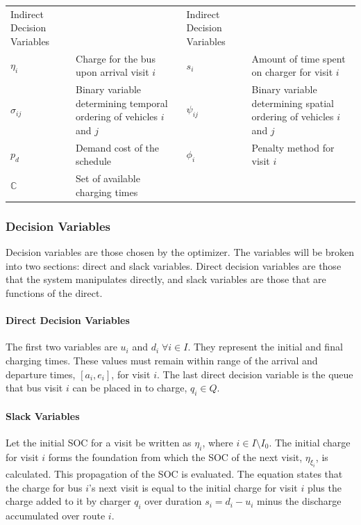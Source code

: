 \documentclass[11pt,a4paper,final]{article}
\newcommand{\C}{\mathbb{C}}                 %
\newcommand{\Iset}{I}                       %
\newcommand{\Qset}{Q}                       %
\begin{document}
\begin{table}[htbp]
\begin{tabularx}{\textwidth}{L{0.3} L{1.2} L{0.3} L{1.2}}
Indirect Decision Variables &  & Indirect Decision Variables & \\[0pt]
\(\eta_i\) & Charge for the bus upon arrival visit \(i\) & \(s_i\) & Amount of time spent on charger for visit \(i\)\\[0pt]
\(\sigma_{ij}\) & Binary variable determining temporal ordering of vehicles \(i\) and \(j\) & \(\psi_{ij}\) & Binary variable determining spatial ordering of vehicles \(i\) and \(j\)\\[0pt]
\(p_{d}\) & Demand cost of the schedule & \(\phi_i\) & Penalty method for visit \(i\)\\[0pt]
\(\C\) & Set of available charging times &  & \\[0pt]
\hline
\end{tabularx}
\end{table}

\subsubsection{Decision Variables}
\label{sec:decision-variables}
Decision variables are those chosen by the optimizer. The variables will be broken into two sections: direct and slack
variables. Direct decision variables are those that the system manipulates directly, and slack variables are those that
are functions of the direct.

\paragraph{Direct Decision Variables}
\label{sec:direct-decision-variables}
The first two variables are \(u_i\) and \(d_i \; \forall i \in \Iset\). They represent the initial and final charging times. These
values must remain within range of the arrival and departure times, \([a_i, e_i]\), for visit \(i\). The last direct
decision variable is the queue that bus visit \(i\) can be placed in to charge, \(q_i \in \Qset\).

\paragraph{Slack Variables}
\label{sec:slack-decision-variables}
Let the initial SOC for a visit be written as \(\eta_i\), where \(i \in \Iset \setminus \Iset_0\). The initial charge for visit \(i\) forms
the foundation from which the SOC of the next visit, \(\eta_{\xi_i}\), is calculated. This propagation of the SOC is evaluated.
The equation states that the charge for bus \(i\)'s next visit is equal to the initial charge for visit \(i\) plus the
charge added to it by charger \(q_i\) over duration \(s_i = d_i - u_i\) minus the discharge accumulated over route \(i\).
\end{document}
